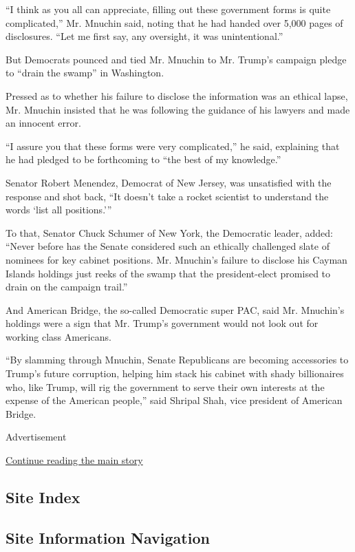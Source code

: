 ``I think as you all can appreciate, filling out these government forms
is quite complicated,'' Mr. Mnuchin said, noting that he had handed over
5,000 pages of disclosures. ``Let me first say, any oversight, it was
unintentional.''

But Democrats pounced and tied Mr. Mnuchin to Mr. Trump's campaign
pledge to ``drain the swamp'' in Washington.

Pressed as to whether his failure to disclose the information was an
ethical lapse, Mr. Mnuchin insisted that he was following the guidance
of his lawyers and made an innocent error.

``I assure you that these forms were very complicated,'' he said,
explaining that he had pledged to be forthcoming to ``the best of my
knowledge.''

Senator Robert Menendez, Democrat of New Jersey, was unsatisfied with
the response and shot back, ``It doesn't take a rocket scientist to
understand the words `list all positions.'''

To that, Senator Chuck Schumer of New York, the Democratic leader,
added: ``Never before has the Senate considered such an ethically
challenged slate of nominees for key cabinet positions. Mr. Mnuchin's
failure to disclose his Cayman Islands holdings just reeks of the swamp
that the president-elect promised to drain on the campaign trail.''

And American Bridge, the so-called Democratic super PAC, said Mr.
Mnuchin's holdings were a sign that Mr. Trump's government would not
look out for working class Americans.

``By slamming through Mnuchin, Senate Republicans are becoming
accessories to Trump's future corruption, helping him stack his cabinet
with shady billionaires who, like Trump, will rig the government to
serve their own interests at the expense of the American people,'' said
Shripal Shah, vice president of American Bridge.

Advertisement

\protect\hyperlink{after-bottom}{Continue reading the main story}

\hypertarget{site-index}{%
\subsection{Site Index}\label{site-index}}

\hypertarget{site-information-navigation}{%
\subsection{Site Information
Navigation}\label{site-information-navigation}}

